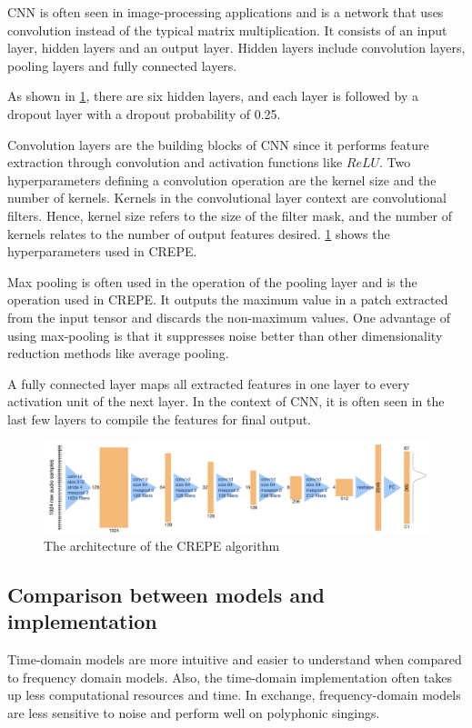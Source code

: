 \begin{enumerate}
    CNN is often seen in image-processing applications and is a network that uses convolution instead of the typical matrix multiplication.
    It consists of an input layer, hidden layers and an output layer. Hidden layers include convolution layers, pooling layers and fully connected layers.
    
    As shown in \cref{CREPE}, there are six hidden layers, and each layer is followed by a dropout layer with a dropout probability of 0.25. 

    Convolution layers are the building blocks of CNN since it performs feature extraction through convolution and activation functions like $ReLU$.
    Two hyperparameters defining a convolution operation are the kernel size and the number of kernels. Kernels in the convolutional layer context are convolutional
    filters. Hence, kernel size refers to the size of the filter mask, and the number of kernels relates to the number of output features desired. \cref{CREPE} shows the hyperparameters
    used in CREPE.

    Max pooling is often used in the operation of the pooling layer and is the operation used in CREPE. It outputs the maximum value in a patch extracted from the
    input tensor and discards the non-maximum values. 
    One advantage of using max-pooling is that it suppresses noise better than other dimensionality reduction methods like average pooling.

    A fully connected layer maps all extracted features in one layer to every activation unit of the next layer. In the context of CNN, it is often seen in the
    last few layers to compile the features for final output.

    \begin{figure}
        \centering
        \includegraphics[width=0.85\columnwidth]{Figures/CREPE.png}
        \caption{The architecture of the CREPE algorithm}
        \label{CREPE}
    \end{figure}
\end{enumerate}

\subsection{Comparison between models and implementation}
Time-domain models are more intuitive and easier to understand when compared to frequency domain models.
Also, the time-domain implementation often takes up less computational resources and time.
In exchange, frequency-domain models are less sensitive to noise and perform well on polyphonic singings.

